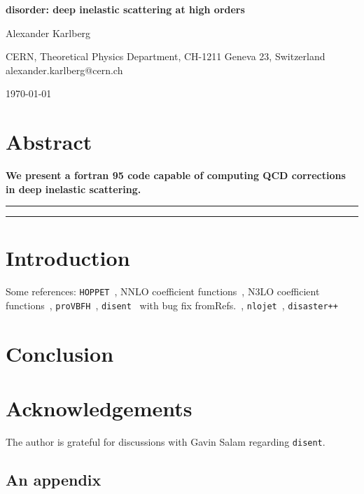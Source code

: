 \documentclass[submission, PhysCodeb]{SciPost}
\newcommand{\hoppet}{{\tt HOPPET}}
\newcommand{\disent}{{\tt disent}}
\newcommand{\provbfh}{{\tt proVBFH}}
\newcommand{\disaster}{{\tt disaster++}}
\newcommand{\nlojet}{{\tt nlojet}}
\begin{document}
\begin{center}{\Large \textbf{
disorder: deep inelastic scattering at high orders\\
}}\end{center}

\begin{center}
Alexander Karlberg
\end{center}

\begin{center}
CERN, Theoretical Physics Department, CH-1211 Geneva 23, Switzerland
\\
{\small \sf alexander.karlberg@cern.ch}
\end{center}

\begin{center}
\today
\end{center}


\section*{Abstract}
{\bf
We present a fortran 95 code capable of computing QCD corrections in deep inelastic scattering.
}


\vspace{10pt}
\noindent\rule{\textwidth}{1pt}
\tableofcontents\thispagestyle{fancy}
\noindent\rule{\textwidth}{1pt}
\vspace{10pt}


\section{Introduction}
\label{sec:intro}
Some references: \hoppet{}~\cite{Salam:2008qg}, NNLO coefficient functions~\cite{vanNeerven:1999ca,vanNeerven:2000uj}, N3LO coefficient functions~\cite{Moch:2004xu,Vermaseren:2005qc,Moch:2008fj,Davies:2016ruz}, \provbfh{}~\cite{Cacciari:2015jma}, \disent{}~\cite{Catani:1996vz} with bug fix fromRefs.~\cite{Borsa:2020ulb,Borsa:2020yxh}, \nlojet{}~\cite{Nagy:2001xb}, \disaster{}~\cite{Graudenz:1997gv}


\section{Conclusion}
\label{sec:conclusion}

\section*{Acknowledgements}
The author is grateful for discussions with Gavin Salam regarding {\tt disent}. 


\begin{appendix}

  \section{An appendix}

\end{appendix}



\nolinenumbers
\end{document}
